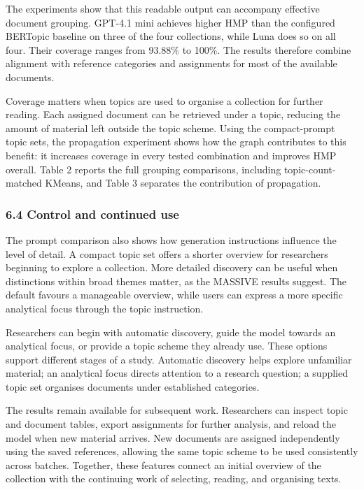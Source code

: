 \documentclass[
  11pt,
  a4paper,
]{article}
\begin{document}
The experiments show that this readable output can accompany effective
document grouping. GPT-4.1 mini achieves higher HMP than the configured
BERTopic baseline on three of the four collections, while Luna does so
on all four. Their coverage ranges from 93.88\% to 100\%. The results
therefore combine alignment with reference categories and assignments
for most of the available documents.

Coverage matters when topics are used to organise a collection for
further reading. Each assigned document can be retrieved under a topic,
reducing the amount of material left outside the topic scheme. Using the
compact-prompt topic sets, the propagation experiment shows how the
graph contributes to this benefit: it increases coverage in every tested
combination and improves HMP overall. Table 2 reports the full grouping
comparisons, including topic-count-matched KMeans, and Table 3 separates
the contribution of propagation.

\subsubsection{6.4 Control and continued
use}\label{control-and-continued-use}

The prompt comparison also shows how generation instructions influence
the level of detail. A compact topic set offers a shorter overview for
researchers beginning to explore a collection. More detailed discovery
can be useful when distinctions within broad themes matter, as the
MASSIVE results suggest. The default favours a manageable overview,
while users can express a more specific analytical focus through the
topic instruction.

Researchers can begin with automatic discovery, guide the model towards
an analytical focus, or provide a topic scheme they already use. These
options support different stages of a study. Automatic discovery helps
explore unfamiliar material; an analytical focus directs attention to a
research question; a supplied topic set organises documents under
established categories.

The results remain available for subsequent work. Researchers can
inspect topic and document tables, export assignments for further
analysis, and reload the model when new material arrives. New documents
are assigned independently using the saved references, allowing the same
topic scheme to be used consistently across batches. Together, these
features connect an initial overview of the collection with the
continuing work of selecting, reading, and organising texts.
\end{document}
